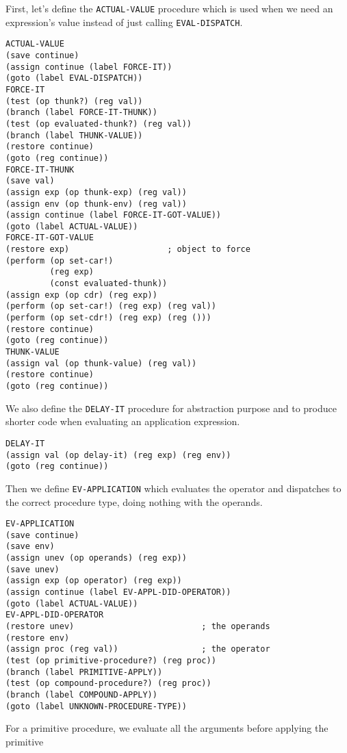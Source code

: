 \documentclass[a4paper,12pt]{article}
\begin{document}
First, let's define the \lstinline!ACTUAL-VALUE! procedure which is
used when we need an expression's value instead of just calling
\lstinline!EVAL-DISPATCH!.

\begin{lstlisting}
ACTUAL-VALUE
(save continue)
(assign continue (label FORCE-IT))
(goto (label EVAL-DISPATCH))
FORCE-IT
(test (op thunk?) (reg val))
(branch (label FORCE-IT-THUNK))
(test (op evaluated-thunk?) (reg val))
(branch (label THUNK-VALUE))
(restore continue)
(goto (reg continue))
FORCE-IT-THUNK
(save val)
(assign exp (op thunk-exp) (reg val))
(assign env (op thunk-env) (reg val))
(assign continue (label FORCE-IT-GOT-VALUE))
(goto (label ACTUAL-VALUE))
FORCE-IT-GOT-VALUE
(restore exp)                    ; object to force
(perform (op set-car!)
         (reg exp)
         (const evaluated-thunk))
(assign exp (op cdr) (reg exp))
(perform (op set-car!) (reg exp) (reg val))
(perform (op set-cdr!) (reg exp) (reg ()))
(restore continue)
(goto (reg continue))
THUNK-VALUE
(assign val (op thunk-value) (reg val))
(restore continue)
(goto (reg continue))
\end{lstlisting}

We also define the \lstinline!DELAY-IT! procedure for abstraction
purpose and to produce shorter code when evaluating an application
expression.

\begin{lstlisting}
DELAY-IT
(assign val (op delay-it) (reg exp) (reg env))
(goto (reg continue))
\end{lstlisting}

Then we define \lstinline!EV-APPLICATION! which evaluates the operator
and dispatches to the correct procedure type, doing nothing with the
operands.

\begin{lstlisting}
EV-APPLICATION
(save continue)
(save env)
(assign unev (op operands) (reg exp))
(save unev)
(assign exp (op operator) (reg exp))
(assign continue (label EV-APPL-DID-OPERATOR))
(goto (label ACTUAL-VALUE))
EV-APPL-DID-OPERATOR
(restore unev)                          ; the operands
(restore env)
(assign proc (reg val))                 ; the operator
(test (op primitive-procedure?) (reg proc))
(branch (label PRIMITIVE-APPLY))
(test (op compound-procedure?) (reg proc))
(branch (label COMPOUND-APPLY))
(goto (label UNKNOWN-PROCEDURE-TYPE))
\end{lstlisting}

For a primitive procedure, we evaluate all the arguments before
applying the primitive
\end{document}
